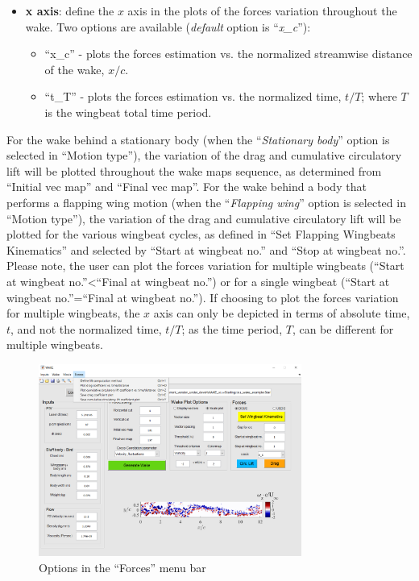 \documentclass[12pt,a4paper]{article}
\begin{document}
\begin{itemize}
	\item \textbf{x axis}: define the $x$ axis in the plots of the forces variation throughout the wake. Two options are available (\textit{default} option is ``\textit{x\_c}''):
	\begin{itemize}
		\item ``x\_c'' - plots the forces estimation vs. the normalized streamwise distance of the wake, $x/c$.
		\item ``t\_T'' - plots the forces estimation vs. the normalized time, $t/T$; where $T$ is the wingbeat total time period.
	\end{itemize}
\end{itemize}
For the wake behind a stationary body (when the ``\textit{Stationary body}'' option is selected in ``Motion type''), the variation of the drag and cumulative circulatory lift will be plotted throughout the wake maps sequence, as determined from ``Initial vec map'' and ``Final vec map''.
For the wake behind a body that performs a flapping wing motion (when the ``\textit{Flapping wing}'' option is selected in ``Motion type''), the variation of the drag and cumulative circulatory lift will be plotted for the various wingbeat cycles, as defined in ``Set Flapping Wingbeats Kinematics'' and selected by ``Start at wingbeat no.'' and ``Stop at wingbeat no.''.
Please note, the user can plot the forces variation for multiple wingbeats (``Start at wingbeat no.''<``Final at wingbeat no.'') or for a single wingbeat (``Start at wingbeat no.''=``Final at wingbeat no.''). If choosing to plot the forces variation for multiple wingbeats, the $x$ axis can only be depicted in terms of absolute time, $t$, and not the normalized time, $t/T$; as the time period, $T$, can be different for multiple wingbeats. 


\begin{figure}[ht!]
	\centering
	\includegraphics[width=0.77\textwidth]{Forces-menubar}
	\caption{Options in the ``Forces'' menu bar}
	\label{fig:GUI-Forces-menubar}
\end{figure}
\end{document}
